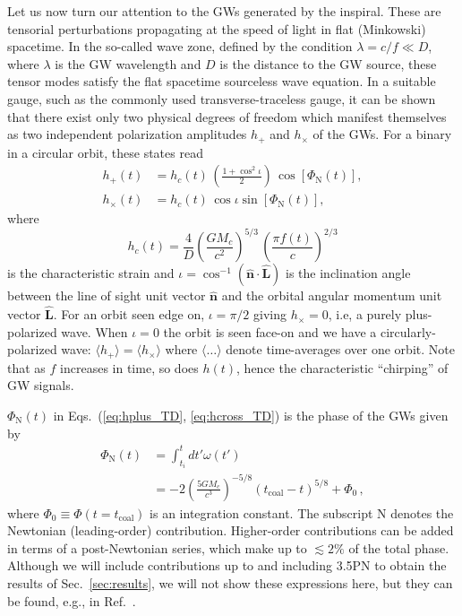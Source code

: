 \documentclass[prd,amsmath,amssymb,aps,floats,amsfonts,notitlepage,superscriptaddress,eqsecnum,nofootinbib,10pt]{revtex4-1}
\newcommand{\nn}{\nonumber}
\newcommand{\f}{\frac}
\newcommand{\be}{\begin{equation}}
\newcommand{\ee}{\end{equation}}
\begin{document}
Let us now turn our attention to the GWs generated by the inspiral.
These are tensorial perturbations propagating at the speed of light in flat (Minkowski) spacetime.
In the so-called wave zone, defined by the condition $ \lambda= c/f \ll D$, where $\lambda$ is the GW wavelength and $D$ is the distance to the GW source, 
these tensor modes satisfy the flat spacetime sourceless wave equation. %
In a suitable gauge, such as the commonly used transverse-traceless gauge, 
it can be shown that there exist only two physical degrees of freedom which manifest themselves as two independent polarization amplitudes $h_+$ and $h_\times$ of the GWs. %
For a binary in a circular orbit, these states read \cite{Maggiore}
%
\begin{align}
 h_+(t) &= h_c(t)\, \left(\f{1+\cos^2\iota}{2}\right)\, \cos[\Phi_\text{N}(t)],\label{eq:hplus_TD}\\
 h_\times(t) & =h_c(t)\,\cos\iota \sin[\Phi_\text{N}(t)]\label{eq:hcross_TD},
\end{align}
%
%
where
%
\be
h_c(t) =\f{4}{D}\left(\f{G M_c}{c^2}\right)^{5/3}\, \left(\f{\pi f(t)}{c}\right)^{2/3} \label{eq:h_c}
\ee
is the characteristic strain and
$\iota=\cos^{-1}(\mathbf{\hat{n}}\cdot{\mathbf{\hat{L}}}) $ is the inclination angle between the line of sight unit vector $\mathbf{\hat{n}} $ and the orbital angular momentum unit vector $\mathbf{\hat{L}}$. 
For an orbit seen edge on, $\iota = \pi/2$ giving $h_\times=0$, i.e,  a purely plus-polarized wave.
When $\iota=0$ the orbit is seen face-on and we have a circularly-polarized wave: $\langle h_+ \rangle = \langle h_\times\rangle$ where $\langle \ldots \rangle$
denote time-averages over one orbit. Note that as $f$ increases in time, so does $h(t)$, hence the characteristic ``chirping'' of GW signals.

$\Phi_\text{N}(t)$ in Eqs.~(\ref{eq:hplus_TD}, \ref{eq:hcross_TD}) is the phase of the GWs given by
%
\begin{align}
\Phi_\text{N}(t) &=\int_{t_i}^t dt' \omega(t') \nn\\
&= -2\left(\f{5 G M_c}{c^3}\right)^{-5/8} (t_\text{coal}-t)^{5/8}+ \Phi_0 \, ,\label{eq:Phase}
\end{align}
%
where $\Phi_0 \equiv \Phi(t=t_\text{coal})$ is an integration constant. The subscript N denotes the Newtonian (leading-order) contribution. 
Higher-order contributions can be added in terms of a post-Newtonian series, which make up to $\lesssim 2\%$ of the total phase.
Although we will include contributions up to and including 3.5PN to obtain the results of Sec.~\ref{sec:results}, 
we will not show these expressions here, but they can be found, e.g., in Ref.~\cite{Blanchet_LRR}.
\end{document}

